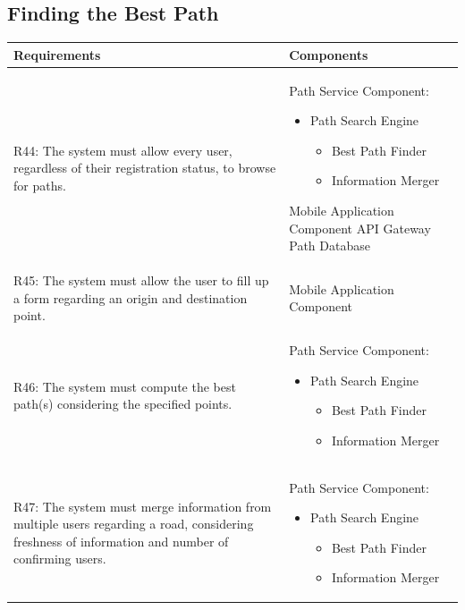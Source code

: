 \subsection{Finding the Best Path}
\begin{table}[ht]
\begin{tabular}{|p{9cm}|p{6cm}|}
\hline
\textbf{Requirements}      & \multicolumn{1}{l|}{\textbf{Components}}\\ \hline
R44: The system must allow every user, regardless of their registration status, to browse for paths.
&
Path Service Component:
\begin{itemize}
    \item Path Search Engine
        \begin{itemize}
            \item Best Path Finder
            \item Information Merger
        \end{itemize}
\end{itemize}
Mobile Application Component
\newline
API Gateway
\newline
Path Database
\\ \hline
R45: The system must allow the user to fill up a form regarding an origin and destination point.  
&
Mobile Application Component
\\ \hline
R46: The system must compute the best path(s) considering the specified points. 
&
Path Service Component:
\begin{itemize}
    \item Path Search Engine
        \begin{itemize}
            \item Best Path Finder
            \item Information Merger
            \newline
        \end{itemize}
\end{itemize}
\\ \hline
R47: The system must merge information from multiple users regarding a road, considering freshness of information and number of confirming users. 
&
Path Service Component:
\begin{itemize}
    \item Path Search Engine
        \begin{itemize}
            \item Best Path Finder
            \item Information Merger

\end{itemize}
\end{itemize}
\end{tabular}
\end{table}
